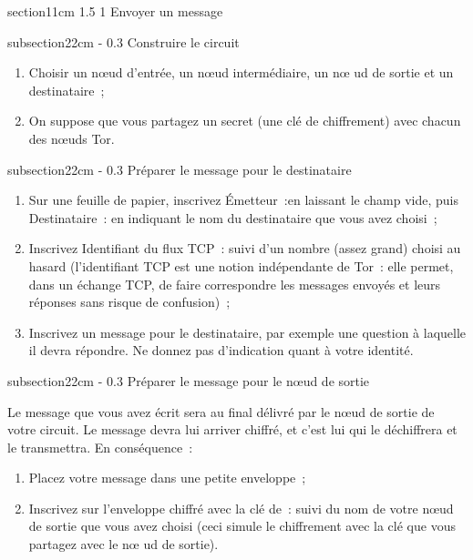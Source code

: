 \documentclass[a4paper,twoside,french]{article}
\makeatletter
\renewcommand\section{\@startsection
  {section}{1}{1cm}%
  {1.5\baselineskip}%
  {1\baselineskip}%
  {\normalfont\Large\bfseries}}%
\renewcommand\subsection{\@startsection
  {subsection}{2}{2cm}%
  {-\baselineskip}%
  {0.3\baselineskip}%
  {\normalfont\normalsize\itshape\bfseries}}%
\makeatother
\begin{document}
  \section{Envoyer un message}

  \subsection{Construire le circuit}

  \begin{enumerate}
  \item Choisir un n\oe ud d'entrée, un n\oe ud intermédiaire, un n\oe
    ud de sortie et un destinataire~;
  \item On suppose que vous partagez un secret (une clé de
    chiffrement) avec chacun des n\oe uds Tor.
  \end{enumerate}

  \subsection{Préparer le message pour le destinataire}

  \begin{enumerate}
  \item Sur une feuille de papier, inscrivez \og Émetteur~:\fg en
    laissant le champ vide, puis \og Destinataire~: \fg en indiquant
    le nom du destinataire que vous avez choisi~;
  \item Inscrivez \og Identifiant du flux TCP~: \og suivi d'un nombre
    (assez grand) choisi au hasard (l'identifiant TCP est une notion
    indépendante de Tor~: elle permet, dans un échange TCP, de faire
    correspondre les messages envoyés et leurs réponses sans risque de
    confusion)~;
  \item Inscrivez un message pour le destinataire, par exemple une
    question à laquelle il devra répondre. Ne donnez pas d'indication
    quant à votre identité.
  \end{enumerate}

  \subsection{Préparer le message pour le n\oe ud de sortie}

  Le message que vous avez écrit sera au final délivré par le n\oe ud
  de sortie de votre circuit. Le message devra lui arriver chiffré,
  et c'est lui qui le déchiffrera et le transmettra. En conséquence~:
  \begin{enumerate}
  \item Placez votre message dans une petite enveloppe~;
  \item Inscrivez sur l'enveloppe \og chiffré avec la clé de~:\fg
    suivi du nom de votre n\oe ud de sortie que vous avez choisi (ceci
    simule le chiffrement avec la clé que vous partagez avec le n\oe
    ud de sortie).
  \end{enumerate}
\end{document}
